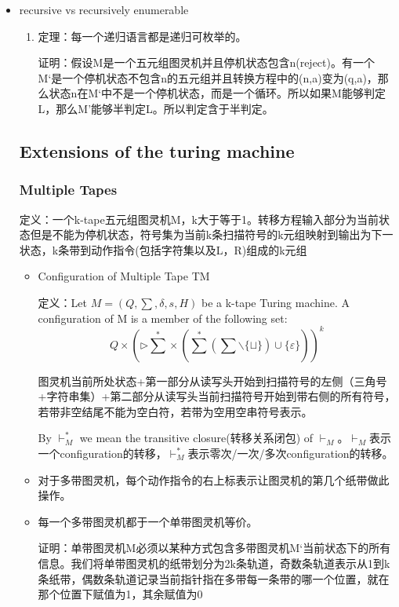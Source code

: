 \documentclass[UTF8]{ctexart}
\begin{document}
\begin{itemize}
    \item recursive vs recursively enumerable
    \begin{enumerate}
        \item 定理：每一个递归语言都是递归可枚举的。
        
        证明：假设M是一个五元组图灵机并且停机状态包含n(reject)。有一个M‘是一个停机状态不包含n的五元组并且转换方程中的(n,a)变为(q,a)，那么状态n在M‘中不是一个停机状态，而是一个循环。所以如果M能够判定L，那么M’能够半判定L。所以判定含于半判定。

    \end{enumerate}

\subsection{Extensions of the turing machine}
\subsubsection{Multiple Tapes}

定义：一个k-tape五元组图灵机M，k大于等于1。转移方程输入部分为当前状态但是不能为停机状态，符号集为当前k条扫描符号的k元组映射到输出为下一状态，k条带到动作指令(包括字符集以及L，R)组成的k元组

\begin{itemize}
    \item Configuration of Multiple Tape TM
    
    定义：Let \(M=(Q, \sum , \delta, s, H)\) be a k-tape Turing machine. A configuration of M is a member of the following set: \[Q\times (\triangleright \sum ^{*}\times (\sum ^{*}(\sum \backslash \{ \sqcup \} )\cup \{ \varepsilon \} ))^{k}\]

    图灵机当前所处状态+第一部分从读写头开始到扫描符号的左侧（三角号+字符串集）+第二部分从读写头当前扫描符号开始到带右侧的所有符号，若带非空结尾不能为空白符，若带为空用空串符号表示。

    By \(\vdash_{M}^{*}\) we mean the transitive closure(转移关系闭包) of \(\vdash_{M}\)。\(\vdash_{M}\)表示一个configuration的转移，\(\vdash_{M}^{*}\)表示零次/一次/多次configuration的转移。

    \item 对于多带图灵机，每个动作指令的右上标表示让图灵机的第几个纸带做此操作。
    \item 每一个多带图灵机都于一个单带图灵机等价。
    
    证明：单带图灵机M必须以某种方式包含多带图灵机M‘当前状态下的所有信息。我们将单带图灵机的纸带划分为2k条轨道，奇数条轨道表示从1到k条纸带，偶数条轨道记录当前指针指在多带每一条带的哪一个位置，就在那个位置下赋值为1，其余赋值为0
    

\end{itemize}
\end{itemize}
\end{document}
